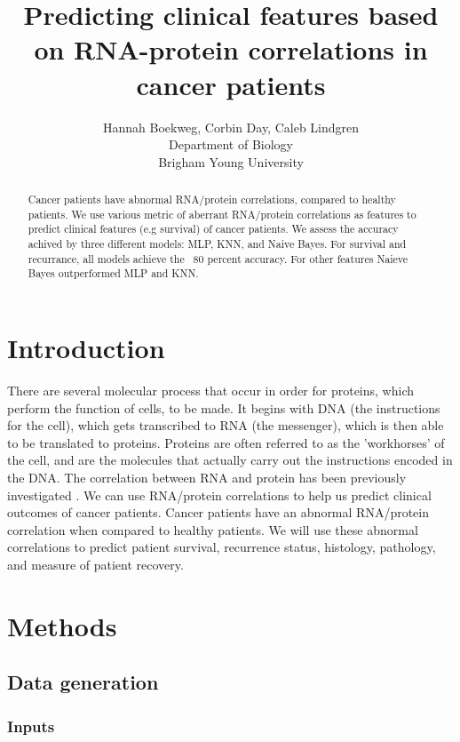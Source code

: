 \documentclass{article}
\title{Predicting clinical features based on RNA-protein correlations in cancer patients}
\author{Hannah Boekweg, Corbin Day, Caleb Lindgren \\
Department of Biology\\
Brigham Young University}
\begin{document}
\maketitle

\begin{abstract}
  Cancer patients have abnormal RNA/protein correlations, compared to healthy patients.
  We use various metric of aberrant RNA/protein correlations as features to predict clinical features (e.g survival) of cancer patients.
  We assess the accuracy achived by three different models: MLP, KNN, and Naive Bayes. For survival and recurrance, all models achieve the ~80 percent accuracy. For other features Naieve Bayes outperformed MLP and KNN.

\end{abstract}

\section{Introduction}
There are several molecular process that occur in order for proteins, which perform the function of cells, to be made. 
It begins with DNA (the instructions for the cell), which gets transcribed to RNA (the messenger), which is then able to be translated to proteins. 
Proteins are often referred to as the 'workhorses' of the cell, and are the molecules that actually carry out the instructions encoded in the DNA.
The correlation between RNA and protein has been previously investigated \cite{waldbauer_transcriptome_2012} \cite{payne_utility_2015} \cite{han_transcriptome_2021}.
We can use RNA/protein correlations to help us predict clinical outcomes of cancer patients. Cancer patients have an abnormal RNA/protein correlation when compared to healthy patients. 
We will use these abnormal correlations to predict patient survival, recurrence status, histology, pathology, and measure of patient recovery. 

\section{Methods}

\subsection{Data generation}

\subsubsection{Inputs}
\end{document}
